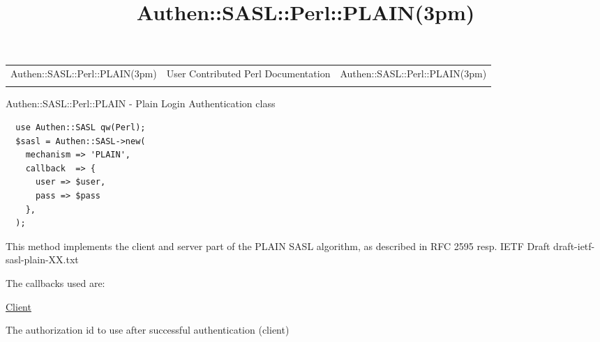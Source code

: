 \documentclass[]{article}
\title{Authen::SASL::Perl::PLAIN(3pm)}
\author{}
\date{}
\renewcommand{\emph}[1]{\underline{#1}}
\begin{document}
\maketitle

\begin{longtable}[c]{@{}lll@{}}
\toprule\addlinespace
Authen::SASL::Perl::PLAIN(3pm) & User Contributed Perl Documentation &
Authen::SASL::Perl::PLAIN(3pm)
\\\addlinespace
\bottomrule
\end{longtable}


Authen::SASL::Perl::PLAIN - Plain Login Authentication class


\begin{verbatim}
  use Authen::SASL qw(Perl);
  $sasl = Authen::SASL->new(
    mechanism => 'PLAIN',
    callback  => {
      user => $user,
      pass => $pass
    },
  );
\end{verbatim}


This method implements the client and server part of the PLAIN SASL
algorithm, as described in RFC 2595 resp. IETF Draft
draft-ietf-sasl-plain-XX.txt


The callbacks used are:

\emph{Client}

\begin{description}
\itemsep1pt\parskip0pt
\item[authname]
The authorization id to use after successful authentication (client)
\end{description}
\end{document}

